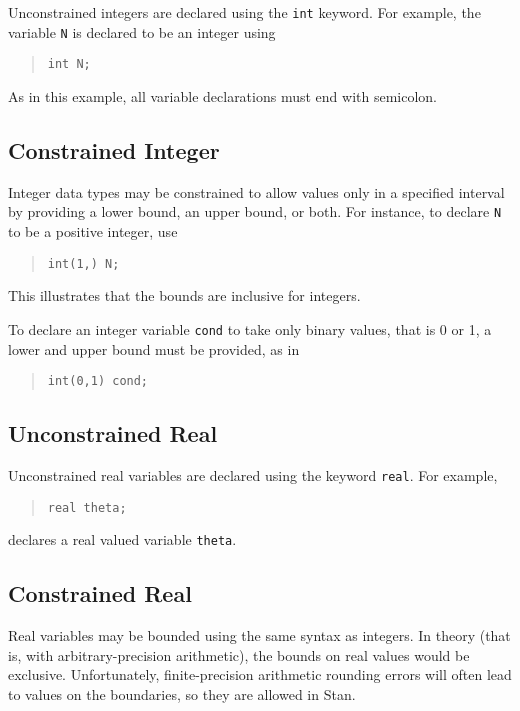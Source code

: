 \documentclass[10pt]{report}
\newcommand{\Stan}{Stan\xspace}
\newcommand{\code}[1]{{\tt #1}}
\begin{document}
Unconstrained integers are declared using the \code{int} keyword.
For example, the variable \code{N} is declared to be an integer using
%
\begin{quote}
\begin{Verbatim} 
int N;
\end{Verbatim}
\end{quote}
% 
As in this example, all variable declarations must end with semicolon.

\subsection{Constrained Integer}

Integer data types may be constrained to allow values only in a
specified interval by providing a lower bound, an upper bound, or
both.  For instance, to declare \code{N} to be a positive integer, use
%
\begin{quote}
\begin{Verbatim}
int(1,) N;
\end{Verbatim}
\end{quote}
%
This illustrates that the bounds are inclusive for integers.

To declare an integer variable \code{cond} to take only binary values,
that is 0 or 1, a lower and upper bound must be provided, as in
%
\begin{quote}
\begin{Verbatim} 
int(0,1) cond;
\end{Verbatim}
\end{quote}


\subsection{Unconstrained Real}

Unconstrained real variables are declared using the keyword
\code{real}.  For example,
%
\begin{quote}
\begin{Verbatim}
real theta;
\end{Verbatim}
\end{quote}
%
declares a real valued variable \code{theta}.

\subsection{Constrained Real}

Real variables may be bounded using the same syntax as integers.  In
theory (that is, with arbitrary-precision arithmetic), the bounds on
real values would be exclusive.  Unfortunately, finite-precision
arithmetic rounding errors will often lead to values on the
boundaries, so they are allowed in \Stan.
 
\end{document}

